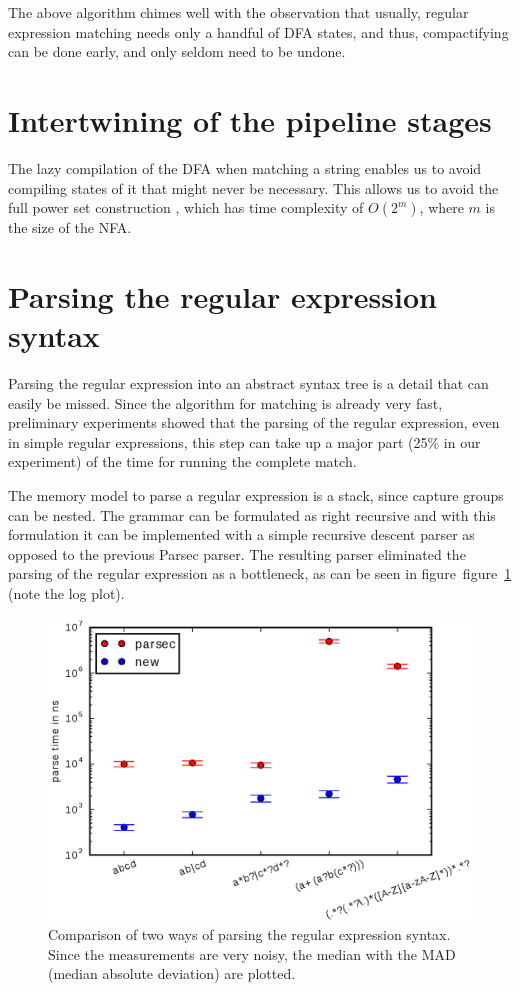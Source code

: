 \documentclass[11pt,a4paper,twoside,openright]{Thesis}
\theoremstyle{definition}
\newcommand{\Figref}[1]{figure~\ref{fig:#1}}
\newcommand{\figlabel}[1]{\label{fig:#1}}
\newcommand{\seclabel}[1]{\label{sec:#1}}
\begin{document}
The above algorithm chimes well with the observation that usually,
regular expression matching needs only a handful of DFA states, and thus,
compactifying can be done early, and only seldom need to be undone.

\section{Intertwining of the pipeline stages}
The lazy compilation of the DFA when matching a string enables us
to avoid compiling states of it that might never be necessary. This
allows us to avoid the full power set construction \cite{Sips05a}, which has
time complexity of $O(2^m)$, where $m$ is the size of the NFA.

\section{Parsing the regular expression syntax}  \seclabel{regex-syntax}
Parsing the regular expression into an abstract syntax tree is a detail that
can easily be missed. Since the algorithm for matching is already very fast,
preliminary experiments showed that the parsing of the regular expression, even
in simple regular expressions, this step can take up a major part (25\% in our
experiment) of the time for running the complete match.

The memory model to parse a regular expression is a stack, since capture groups
can be nested. The grammar can be formulated as right recursive and with this
formulation it can be implemented with a simple recursive descent parser as
opposed to the previous Parsec parser. The resulting parser eliminated the
parsing of the regular expression as a bottleneck, as can be seen in
figure~\Figref{regex-syntax-parsing} (note the log plot).

\begin{figure}
  \includegraphics[width=\linewidth]{graphs/logplot-parserspeed-robust}

  \caption[Regular expression grammar parse time]{\figlabel{regex-syntax-parsing}Comparison of two ways of parsing the
regular expression syntax. Since the measurements are very noisy, the median
with the MAD (median absolute deviation) are plotted.}
\end{figure}
\end{document}
